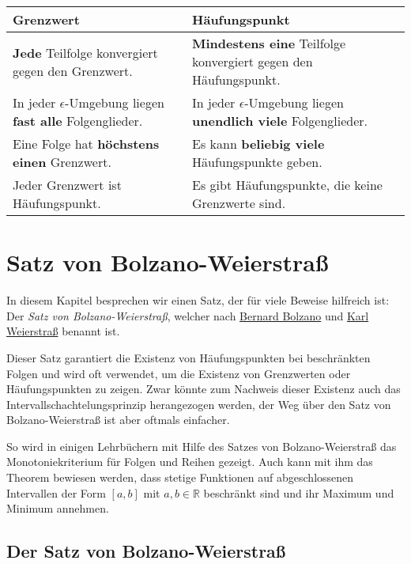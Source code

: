 \documentclass[fontsize=9pt,
               parskip=half-,
               DIV=14,
               listof=chapterentry,
               tocflat]{scrbook}
\begin{document}
\begin{longtabu} to \linewidth {X[l]X[l]} \\ \toprule 
Grenzwert & Häufungspunkt \\ 
\midrule
\textbf{Jede} Teilfolge konvergiert gegen den Grenzwert. & \textbf{Mindestens eine} Teilfolge konvergiert gegen den Häufungspunkt. \\ 
In jeder $\epsilon $-Umgebung liegen \textbf{fast alle} Folgenglieder. & In jeder $\epsilon $-Umgebung liegen \textbf{unendlich viele} Folgenglieder. \\ 
Eine Folge hat \textbf{höchstens einen} Grenzwert. & Es kann \textbf{beliebig viele} Häufungspunkte geben. \\ 
Jeder Grenzwert ist Häufungspunkt. & Es gibt Häufungspunkte, die keine Grenzwerte sind. \\ 
\bottomrule
\end{longtabu}
\renewcommand{\arraystretch}{1.0}


\chapter{Satz von Bolzano-Weierstraß}

In diesem Kapitel besprechen wir einen Satz, der für viele Beweise hilfreich ist: Der \emph{Satz von Bolzano-Weierstraß}, welcher nach \href{https://de.wikipedia.org/wiki/Bernard\%20Bolzano}
{Bernard Bolzano} und \href{https://de.wikipedia.org/wiki/Karl\%20Weierstraß}
{Karl Weierstraß} benannt ist.

Dieser Satz garantiert die Existenz von Häufungspunkten bei beschränkten Folgen und wird oft verwendet, um die Existenz von Grenzwerten oder Häufungspunkten zu zeigen. Zwar könnte zum Nachweis dieser Existenz auch das Intervallschachtelungsprinzip herangezogen werden, der Weg über den Satz von Bolzano-Weierstraß ist aber oftmals einfacher.

So wird in einigen Lehrbüchern mit Hilfe des Satzes von Bolzano-Weierstraß das Monotoniekriterium für Folgen und Reihen gezeigt. Auch kann mit ihm das Theorem bewiesen werden, dass stetige Funktionen auf abgeschlossenen Intervallen der Form $[a,b]$ mit $a,b\in \mathbb {R} $ beschränkt sind und ihr Maximum und Minimum annehmen.

\section{Der Satz von Bolzano-Weierstraß}
\end{document}
